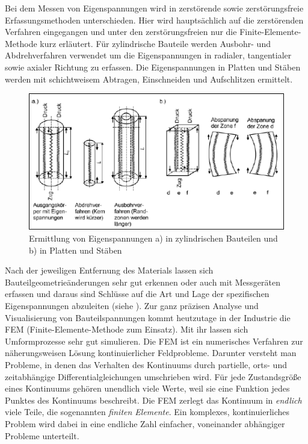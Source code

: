 \documentclass[12pt,a4paper,parskip,twoside,BCOR5mm,headsepline]{scrartcl}
\begin{document}
\begin{description*}
Bei dem Messen von Eigenspannungen wird in zerstörende sowie zerstörungsfreie Erfassungsmethoden unterschieden. Hier wird hauptsächlich auf die zerstörenden Verfahren eingegangen und unter den zerstörungsfreien nur die Finite-Elemente-Methode kurz erläutert. Für zylindrische Bauteile werden Ausbohr- und Abdrehverfahren verwendet um die Eigenspannungen in radialer, tangentialer sowie axialer Richtung zu erfassen. Die Eigenspannungen in Platten und Stäben werden mit schichtweisem Abtragen, Einschneiden und Aufschlitzen ermittelt.\begin{figure}
  \centering
  \includegraphics[width=.8\textwidth]{eigenspanschnitt}
  \caption[Ermittlung von Eigenspannungen]{Ermittlung von Eigenspannungen a) in zylindrischen Bauteilen und b) in Platten und Stäben\autocite[36]{hu}}
  \label{fig:eigenspanschnitt}
  \end{figure}

  Nach der jeweiligen Entfernung des Materials lassen sich Bauteilgeometrieänderungen sehr gut erkennen oder auch mit Messgeräten erfassen und daraus  sind Schlüsse auf die Art und Lage der spezifischen Eigenspannungen abzuleiten (siehe ). Zur ganz präzisen Analyse  und Visualisierung von Bauteilspannungen kommt heutzutage in der Industrie  die FEM (Finite-Elemente-Methode zum Einsatz).\autocite[32-37]{hu} Mit ihr lassen sich Umformprozesse sehr gut simulieren. Die FEM ist ein numerisches Verfahren zur näherungsweisen Lösung kontinuierlicher Feldprobleme. Darunter versteht man Probleme, in denen das Verhalten des Kontinuums durch partielle, orts- und zeitabhängige Differentialgleichungen umschrieben wird. Für jede Zustandsgröße eines Kontinuums gehören unendlich viele Werte, weil sie eine Funktion jedes Punktes des Kontinuums beschreibt. Die FEM zerlegt das Kontinuum in \emph{endlich} viele Teile, die sogenannten \emph{finiten Elemente}. Ein komplexes, kontinuierliches Problem wird dabei in eine endliche Zahl einfacher, voneinander abhängiger Probleme unterteilt.\autocite[48]{fu}

\end{description*}
\end{document}
